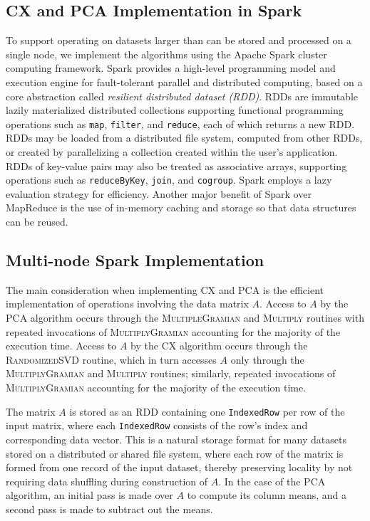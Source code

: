 
\subsection{CX and PCA Implementation in Spark}

To support operating on datasets larger than can be stored and processed on a single node,
we implement the algorithms using the Apache Spark cluster computing framework.
Spark provides a high-level programming model and execution engine for
fault-tolerant parallel and distributed computing, based on a core 
abstraction called \textit{resilient distributed dataset (RDD)}.
RDDs are immutable lazily materialized distributed collections supporting functional
programming operations such as \texttt{map}, \texttt{filter}, and \texttt{reduce},
each of which returns a new RDD.
RDDs may be loaded from a distributed file system, computed from other RDDs,
or created by parallelizing a collection created within the user's application.
RDDs of key-value pairs may also be treated as associative arrays, supporting
operations such as \texttt{reduceByKey}, \texttt{join}, and \texttt{cogroup}.
Spark employs a lazy evaluation strategy for efficiency.
Another major benefit of Spark over MapReduce is the use of in-memory caching and storage so that data structures
can be reused. %

\subsection{Multi-node Spark Implementation}
\label{sec:cx_spark}
The main consideration when implementing CX and PCA is the efficient
implementation of operations involving the data matrix $A$.  Access to $A$ by
the PCA algorithm occurs through the \textsc{MultipleGramian} and
\textsc{Multiply} routines with repeated invocations of
\textsc{MultiplyGramian} accounting for the majority of the execution time.
Access to $A$ by the CX algorithm occurs through the \textsc{RandomizedSVD}
routine, which in turn accesses $A$ only through the \textsc{MultiplyGramian}
and \textsc{Multiply} routines; similarly, repeated invocations of
\textsc{MultiplyGramian} accounting for the majority of the execution time.

The matrix $A$ is stored as an RDD containing one \texttt{IndexedRow} per row of the input matrix,
where each \texttt{IndexedRow} consists of the row's index and corresponding data vector.
This is a natural storage format for many datasets stored on a distributed or shared file
system, where each row of the matrix is formed from one record of the
input dataset, thereby preserving locality by not requiring data shuffling
during construction of $A$. In the case of the PCA algorithm, an initial pass is made over $A$ to compute
its column means, and a second pass is made to subtract out the means.

